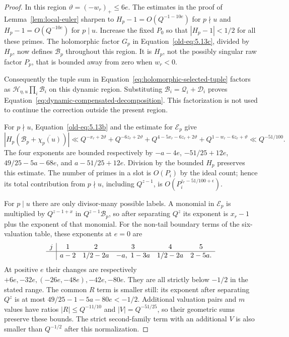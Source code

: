 \documentclass[11pt,a4paper]{article}
\numberwithin{equation}{section}
\numberwithin{figure}{section}
\theoremstyle{definition}
\theoremstyle{remark}
\begin{document}
\begin{proof}
In this region $\vartheta=(-w_r)_+\le6e$.  The estimates in the
proof of Lemma~\ref{lem:local-euler} sharpen to
$H_p-1=O(Q^{-1-10e})$ for $p\nmid u$ and
$H_p-1=O(Q^{-10e})$ for $p\mid u$.  Increase the fixed $P_0$ so
that $|H_p-1|<1/2$ for all these primes.  The holomorphic
factor $G_p$ in Equation~\eqref{old-eq:5.13c}, divided by $H_p$,
now defines $\mathcal B_p$ throughout this region.  It is $H_p$,
not the possibly singular raw factor $P_p$, that is bounded away
from zero when $w_r<0$.

Consequently the tuple sum in Equation~\eqref{eq:holomorphic-selected-tuple}
factors as $\mathcal H_{\eta,u}\prod_i\mathcal B_i$ on this dynamic
region.  Substituting $\mathcal B_i=\mathcal Q_i+\mathcal D_i$ proves
Equation~\eqref{eq:dynamic-compensated-decomposition}.  This factorization
is not used to continue the correction outside the present region.

For $p\nmid u$, Equation~\eqref{old-eq:5.13b} and the estimate for
$\mathcal E_p$ give
\[
 |H_p(\mathcal B_p+\overline{\chi_p(u)})|
 \ll Q^{-x_r+2\vartheta}+Q^{-6z_r+2\vartheta}
       +Q^{4-5x_r-6z_r+2\vartheta}
       +Q^{1-w_r-6z_r+\vartheta}
 \ll Q^{-51/100}.
\]
The four exponents are bounded respectively by
$-a-4e$, $-51/25+12e$, $49/25-5a-68e$, and
$a-51/25+12e$.  Division by the bounded $H_p$ preserves this
estimate.  The number of primes in a slot is $O(P_i)$ by the ideal
count; hence its total contribution from $p\nmid u$, including
$Q^{z-1}$, is $O(P_i^{z_r-51/100+\epsilon})$.

For $p\mid u$ there are only divisor-many possible labels.  A
monomial in $\mathcal E_p$ is multiplied by $Q^{z-1+x}$ in
$Q^{z-1}\mathcal B_p$, so after separating $Q^z$ its exponent is
$x_r-1$ plus the exponent of that monomial.  For the non-tail
boundary terms of the six-valuation table, these exponents at
$e=0$ are
\[
\begin{array}{c|ccccc}
 j&1&2&3&4&5\\\hline
 &a-2&1/2-2a&-a,\ 1-3a&1/2-2a&2-5a.
\end{array}
\]
At positive $e$ their changes are respectively
$+6e,-32e,(-26e,-48e),-42e,-80e$.  They are all strictly below
$-1/2$ in the stated range.  The common $R$ term is smaller still:
its exponent after separating $Q^z$ is at most $49/25-1-5a-80e<-1/2$.
Additional valuation pairs and $m$ values have ratios
$|R|\le Q^{-11/10}$ and $|V|=Q^{-51/25}$, so their geometric sums
preserve these bounds.  The strict second-family term with an
additional $V$ is also smaller than $Q^{-1/2}$ after this
normalization.


\end{proof}
\end{document}
